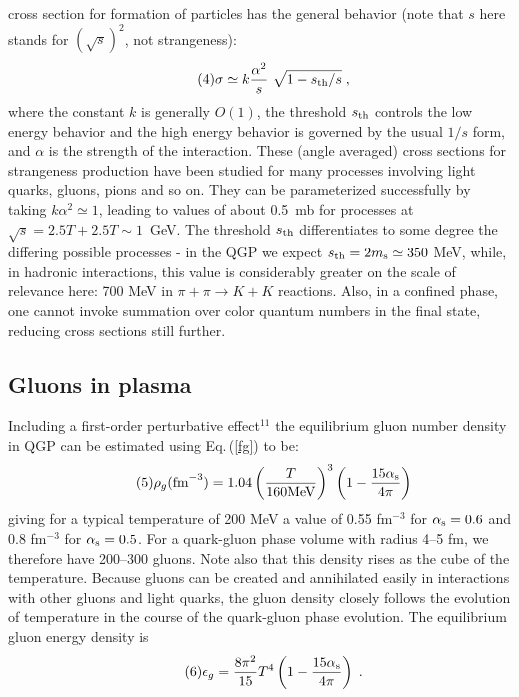 \begin{mdframed}[linecolor=gray,roundcorner=12pt,backgroundcolor=Dandelion!15,linewidth=1pt,leftmargin=0cm,rightmargin=0cm,topline=true,bottomline=true,skipabove=12pt]
cross section for formation of particles has the general behavior (note
that $s$ here stands for $(\sqrt{s})^2$, not strangeness):
\begin{align*}\tag{4}
\sigma\simeq k\frac{\alpha^2}{s}\ \sqrt{1-s_{\rm th}/s}\;,
\end{align*}
where the constant $k$ is generally $O(1)$, the threshold $s_{\rm th}$
controls the low energy behavior and the high energy behavior is governed
by the usual $1/s$ form, and $\alpha$ is the strength of the interaction.
These (angle averaged) cross sections for strangeness production have
been studied for many processes involving light quarks, gluons, pions and
so on. They can be parameterized successfully by taking $k\alpha^2\simeq
1$, leading to values of about 0.5~mb for processes at
$\sqrt{s}=2.5T+2.5T\sim1$~GeV. The threshold $s_{\rm th}$ differentiates
to some degree the differing possible processes - in the QGP we expect
$s_{\rm th}=2m_{\rm s}\simeq 350$ MeV, while, in hadronic interactions,
this value is considerably greater on the scale of relevance here: 700
MeV in $\pi+\pi\rightarrow K+K$ reactions. Also, in a confined phase, one
cannot invoke summation over color quantum numbers in the final state,
reducing cross sections still further.
 
\subsection*{Gluons in plasma} 
Including a first-order perturbative effect$^{11}$ the equilibrium gluon
number density in QGP can be estimated using Eq.\,(\ref{fg}) to be:
\begin{equation}\tag{5}
\rho_g \mbox{(fm}^{-3}) = 1.04 \left( {T\over 160\mbox{MeV}} \right)^3
\left( 1- {{15\alpha_{\rm s}}\over{4\pi}} \right)
\end{equation}
giving for a typical temperature of 200 MeV a value of 0.55 fm$^{-3}$ for
$\alpha_{\rm s} = 0.6$ and 0.8 fm$^{-3}$ for $\alpha_{\rm s} = 0.5$. For
a quark-gluon phase volume with radius 4--5 fm, we therefore have
200--300 gluons. Note also that this density rises as the cube of the
temperature. Because gluons can be created and annihilated easily in
interactions with other gluons and light quarks, the gluon density
closely follows the evolution of temperature in the course of the
quark-gluon phase evolution. The equilibrium gluon energy density is
\begin{equation}\tag{6}
\epsilon_g = {8\pi^2\over 15} T^4 \left( 1 - {15\alpha_{\rm s}\over 4\pi}
\right)\;.
\label{fg}
\end{equation}
 

\end{mdframed}
